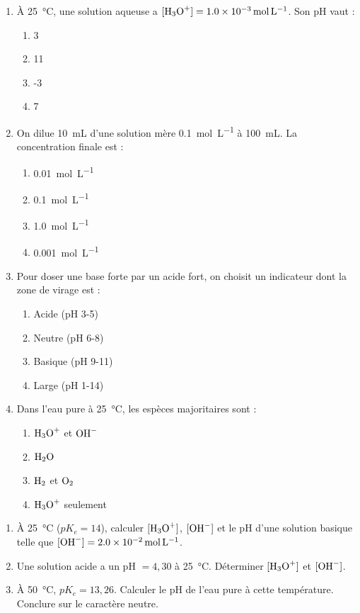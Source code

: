 \documentclass[11pt]{article}
\begin{document}
\begin{exercice}
\begin{enumerate}
    \item À \SI{25}{\celsius}, une solution aqueuse a $[\ce{H3O+}] = \SI{1,0e-3}{\mol\per\liter}$. Son pH vaut :
    \begin{enumerate}
        \item 3 \item 11 \item -3 \item 7
    \end{enumerate}
    \item On dilue \SI{10}{\milli\liter} d'une solution mère \SI{0,1}{\mol\per\liter} à \SI{100}{\milli\liter}. La concentration finale est :
    \begin{enumerate}
        \item \SI{0,01}{\mol\per\liter} \item \SI{0,1}{\mol\per\liter} \item \SI{1,0}{\mol\per\liter} \item \SI{0,001}{\mol\per\liter}
    \end{enumerate}
    \item Pour doser une base forte par un acide fort, on choisit un indicateur dont la zone de virage est :
    \begin{enumerate}
        \item Acide (pH 3-5) \item Neutre (pH 6-8) \item Basique (pH 9-11) \item Large (pH 1-14)
    \end{enumerate}
    \item Dans l'eau pure à \SI{25}{\celsius}, les espèces majoritaires sont :
    \begin{enumerate}
        \item $\ce{H3O+}$ et $\ce{OH-}$ \item $\ce{H2O}$ \item $\ce{H2}$ et $\ce{O2}$ \item $\ce{H3O+}$ seulement
    \end{enumerate}
\end{enumerate}
\end{exercice}

\begin{exercice}
\begin{enumerate}
    \item À \SI{25}{\celsius} ($pK_e = 14$), calculer $[\ce{H3O+}]$, $[\ce{OH-}]$ et le pH d'une solution basique telle que $[\ce{OH-}] = \SI{2,0e-2}{\mol\per\liter}$.
    \item Une solution acide a un pH $= 4,30$ à \SI{25}{\celsius}. Déterminer $[\ce{H3O+}]$ et $[\ce{OH-}]$.
    \item À \SI{50}{\celsius}, $pK_e = 13,26$. Calculer le pH de l'eau pure à cette température. Conclure sur le caractère neutre.
\end{enumerate}
\end{exercice}
\end{document}
